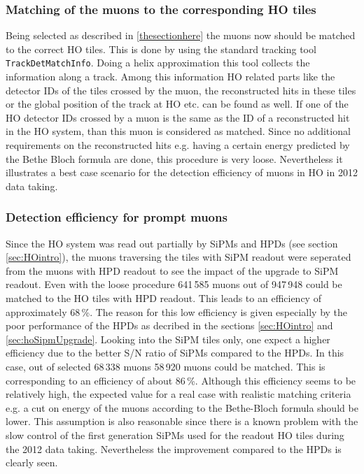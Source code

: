 		\subsubsection{Matching of the muons to the corresponding HO tiles}
			Being selected as described in \ref{thesectionhere} the muons now should be matched to the correct HO tiles.
			This is done by using the standard tracking tool \verb+TrackDetMatchInfo+.
			Doing a helix approximation this tool collects the information along a track.
			Among this information HO related parts like the detector IDs of the tiles crossed by the muon, the reconstructed hits in these tiles or the global position of the track at HO etc. can be
			found as well.
			If one of the HO detector IDs crossed by a muon is the same as the ID of a reconstructed hit in the HO system, than this muon is considered as matched.
			Since no additional requirements on the reconstructed hits e.g. having a certain energy predicted by the Bethe Bloch formula are done, this procedure is very loose.
			Nevertheless it illustrates a best case scenario for the detection efficiency of muons in HO in 2012 data taking.
		\subsubsection{Detection efficiency for prompt muons}
			Since the HO system was read out partially by SiPMs and HPDs (see section \ref{sec:HOintro}), the muons traversing the tiles with SiPM readout were seperated from the muons with HPD readout to
			see the impact of the upgrade to SiPM readout.
			Even with the loose procedure 641\,585 muons out of 947\,948 could be matched to the HO tiles with HPD readout.
			This leads to an efficiency of approximately 68\,\%.
			The reason for this low efficiency is given especially by the poor performance of the HPDs as decribed in the sections \ref{sec:HOintro} and \ref{sec:hoSipmUpgrade}.
			Looking into the SiPM tiles only, one expect a higher efficiency due to the better S/N ratio of SiPMs compared to the HPDs.
			In this case, out of selected 68\,338 muons 58\,920 muons could be matched.
			This is corresponding to an efficiency of about 86\,\%.
			Although this efficiency seems to be relatively high, the expected value for a real case with realistic matching criteria e.g. a cut on energy of the muons according to the Bethe-Bloch formula
			should be lower.
			This assumption is also reasonable since there is a known problem with the slow control of the first generation SiPMs used for the readout HO tiles during the 2012 data taking.
			Nevertheless the improvement compared to the HPDs is clearly seen.
